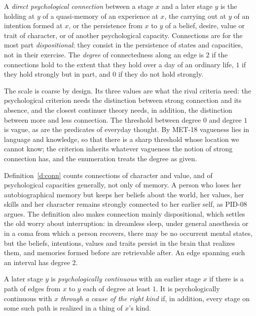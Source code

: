 \documentclass{situationist-preprint}
\begin{document}
\begin{definition}[Connectedness]\label{d:conn}
A \emph{direct psychological connection} between a stage $x$ and a later stage $y$ is the holding at $y$ of a quasi-memory of an experience at $x$, the carrying out at $y$ of an intention formed at $x$, or the persistence from $x$ to $y$ of a belief, desire, value or trait of character, or of another psychological capacity. Connections are for the most part \emph{dispositional}: they consist in the persistence of states and capacities, not in their exercise. The \emph{degree} of connectedness along an edge is $2$ if the connections hold to the extent that they hold over a day of an ordinary life, $1$ if they hold strongly but in part, and $0$ if they do not hold strongly.
\end{definition}

The scale is coarse by design. Its three values are what the rival criteria need: the psychological criterion needs the distinction between strong connection and its absence, and the closest continuer theory needs, in addition, the distinction between more and less connection. The threshold between degree $0$ and degree $1$ is vague, as are the predicates of everyday thought. By MET-18 vagueness lies in language and knowledge, so that there is a sharp threshold whose location we cannot know; the criterion inherits whatever vagueness the notion of strong connection has, and the enumeration treats the degree as given.

Definition~\ref{d:conn} counts connections of character and value, and of psychological capacities generally, not only of memory. A person who loses her autobiographical memory but keeps her beliefs about the world, her values, her skills and her character remains strongly connected to her earlier self, as PID-08 argues. The definition also makes connection mainly dispositional, which settles the old worry about interruption: in dreamless sleep, under general anesthesia or in a coma from which a person recovers, there may be no occurrent mental states, but the beliefs, intentions, values and traits persist in the brain that realizes them, and memories formed before are retrievable after. An edge spanning such an interval has degree $2$.

\begin{definition}[Continuity]\label{d:cont}
A later stage $y$ is \emph{psychologically continuous} with an earlier stage $x$ if there is a path of edges from $x$ to $y$ each of degree at least $1$. It is psychologically continuous with $x$ \emph{through a cause of the right kind} if, in addition, every stage on some such path is realized in a thing of $x$'s kind.
\end{definition}
\end{document}
